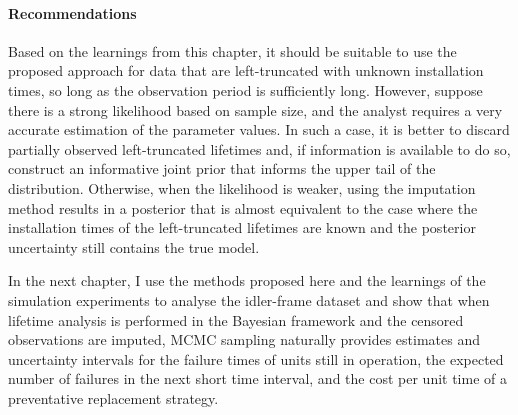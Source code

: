 \paragraph*{Recommendations}
Based on the learnings from this chapter, it should be suitable to use the proposed approach for data that are left-truncated with unknown installation times, so long as the observation period is sufficiently long. However, suppose there is a strong likelihood based on sample size, and the analyst requires a very accurate estimation of the parameter values. In such a case, it is better to discard partially observed left-truncated lifetimes and, if information is available to do so, construct an informative joint prior that informs the upper tail of the distribution. Otherwise, when the likelihood is weaker, using the imputation method results in a posterior that is almost equivalent to the case where the installation times of the left-truncated lifetimes are known and the posterior uncertainty still contains the true model.

In the next chapter, I use the methods proposed here and the learnings of the simulation experiments to analyse the idler-frame dataset and show that when lifetime analysis is performed in the Bayesian framework and the censored observations are imputed, MCMC sampling naturally provides estimates and uncertainty intervals for the failure times of units still in operation, the expected number of failures in the next short time interval, and the cost per unit time of a preventative replacement strategy.